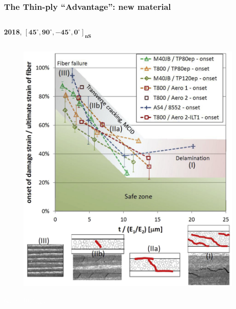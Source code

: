 \documentclass[first,firstsupp,lastsupp,last,hyperref,table]{ETHclass}
\begin{document}
\addtocounter{framenumber}{-1}

\begin{frame}
\frametitle{\vspace{0.3cm}\small The Thin-ply ``Advantage'': new material}
\vspace{-0.8cm}
\centering
\begin{columns}[t]
\begin{column}{0.5\textwidth}
\centering
\tiny
\textbf{2018}, $\mathbf{\left[45^{\circ}, 90^{\circ},-45^{\circ},0^{\circ}\right]_{nS}}$
\end{column}
\begin{column}{0.5\textwidth}
\centering

\end{column}
\end{columns}
\vspace{-0.4cm}
\begin{columns}[c]
\begin{column}{0.5\textwidth}
\begin{figure}
\centering
\includegraphics[width=0.9\columnwidth]{thinply-plythicknesseffect.jpg}
\end{figure}
\vspace{-0.6cm}
\centering
\textcolor{white}{\tiny$t_{90^{\circ}}<10\diameter_{fiber}$}
\end{column}

\end{columns}
\end{frame}
\end{document}

